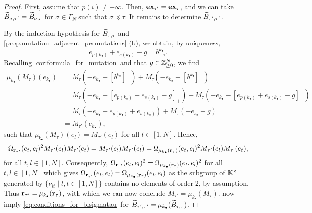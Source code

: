 \begin{proof}
	First, assume that $p(i) \neq -\infty$. Then, $\mathbf{ex}_{\tau'} = \mathbf{ex}_{\tau}$, and we can
	take $\widetilde{B}_{\sigma, \tau'} = \widetilde{B}_{\sigma, \tau}$ for $\sigma \in \Gamma_N$ such that
	$\sigma \preceq \tau$. It remains to determine $\widetilde{B}_{\tau', \tau'}$.

	By the induction hypothesis for $\widetilde{B}_{\tau, \tau}$ and
	\cref{prop:mutation_adjacent_permutations} (b), we obtain, by uniqueness,
	\begin{equation*}
		e_{p(k_\bullet)} + e_{s(k_\bullet)} - g = b^{k_\bullet}_{\tau, \tau}.
	\end{equation*}
	Recalling \cref{cor:formula_for_mutation} and that $g \in \mathbb{Z}_{\geq 0}^N$, we find
	\begin{align*}
		\mu_{k_\bullet}(M_\tau)(e_{k_\bullet})
		 & = M_\tau(-e_{k_\bullet} + [b^{k_\bullet}]_{+}) + M_\tau(-e_{k_\bullet} - [b^{k_\bullet}]_{-})                                                     \\
		 & = M_\tau(-e_{k_\bullet} + [e_{p(k_\bullet)} + e_{s(k_\bullet)} - g]_{+}) + M_\tau(-e_{k_\bullet} - [e_{p(k_\bullet)} + e_{s(k_\bullet)} - g]_{-}) \\
		 & = M_\tau(-e_{k_\bullet} + e_{p(k_\bullet)} + e_{s(k_\bullet)}) + M_\tau(-e_{k_\bullet} + g)                                                       \\
		 & = M_{\tau'}(e_{k_\bullet}),
	\end{align*}
	such that $\mu_{k_\bullet}(M_\tau)(e_l) = M_{\tau'}(e_l)$ for all $l \in [1, N]$. Hence,
	\begin{equation*}
		\Omega_{\mathbf{r}_{\tau'}}(e_t, e_l)^2 M_{\tau'}(e_l)M_{\tau'}(e_t) = M_{\tau'}(e_t)M_{\tau'}(e_l) = \Omega_{\mu_{k_\bullet}(\mathbf{r}_{\tau})}(e_t, e_l)^2 M_{\tau'}(e_l)M_{\tau'}(e_t),
	\end{equation*}
	for all $t, l \in [1, N]$. Consequently, $\Omega_{\mathbf{r}_{\tau'}}(e_t, e_l)^2 =
		\Omega_{\mu_{k_\bullet}(\mathbf{r}_\tau)}(e_t, e_l)^2$ for all $t, l \in [1, N]$ which gives
	$\Omega_{\mathbf{r}_{\tau'}}(e_t, e_l) = \Omega_{\mu_{k_\bullet}(\mathbf{r}_\tau)}(e_t, e_l)$ as
	the subgroup of $\mathbb{K}^\times$ generated by $\{\nu_{lt} \mid l,t \in [1, N]\}$ contains
	no elements of order 2, by assumption. Thus $\mathbf{r}_{\tau'} =
		\mu_{k_\bullet}(\mathbf{r}_{\tau})$, with which we can now conclude $M_{\tau'} =
		\mu_{k_\bullet}(M_\tau)$.
	 now imply
	\cref{eq:conditions_for_blsigmatau} for $\widetilde{B}_{\tau', \tau'} =
		\mu_{k_\bullet}(\widetilde{B}_{\tau, \tau})$. \medskip


\end{proof}
